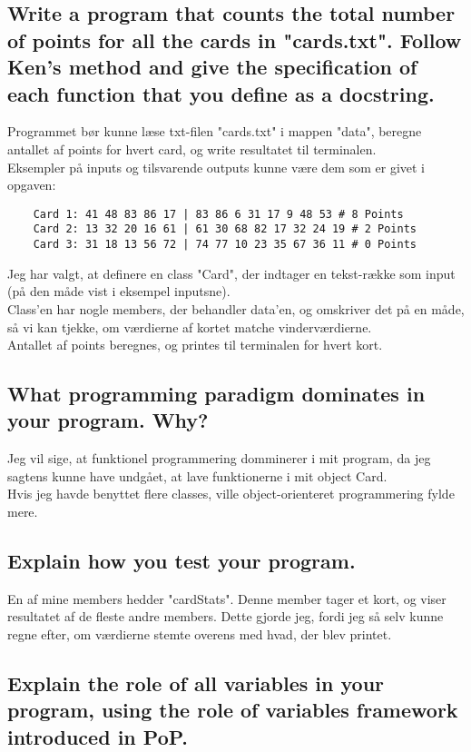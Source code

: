 \documentclass[a4paper,12pt]{article}
\begin{document}
\subsection{Write a program that counts the total number of points for all the cards in "cards.txt".
Follow Ken's method and give the specification of each function that you define as a docstring.}

Programmet bør kunne læse txt-filen "cards.txt" i mappen "data", beregne antallet af points for hvert card, og write resultatet til terminalen.\\
Eksempler på inputs og tilsvarende outputs kunne være dem som er givet i opgaven:
\begin{lstlisting}
    Card 1: 41 48 83 86 17 | 83 86 6 31 17 9 48 53 # 8 Points
    Card 2: 13 32 20 16 61 | 61 30 68 82 17 32 24 19 # 2 Points
    Card 3: 31 18 13 56 72 | 74 77 10 23 35 67 36 11 # 0 Points
\end{lstlisting} 
Jeg har valgt, at definere en class "Card", der indtager en tekst-række som input (på den måde vist i eksempel inputsne).\\
Class'en har nogle members, der behandler data'en, og omskriver det på en måde, så vi kan tjekke, om værdierne af kortet matche vinderværdierne.\\
Antallet af points beregnes, og printes til terminalen for hvert kort.

\subsection{What programming paradigm dominates in your program. Why?}

Jeg vil sige, at funktionel programmering domminerer i mit program, da jeg sagtens kunne have undgået, at lave funktionerne i mit object Card.\\
Hvis jeg havde benyttet flere classes, ville object-orienteret programmering fylde mere. 

\subsection{Explain how you test your program.}

En af mine members hedder "cardStats". Denne member tager et kort, og viser resultatet af de fleste andre members. Dette gjorde jeg, fordi jeg så selv kunne regne efter, om værdierne stemte overens med hvad, der blev printet.

\subsection{Explain the role of all variables in your program, using the role of variables framework introduced in PoP.}
\end{document}
